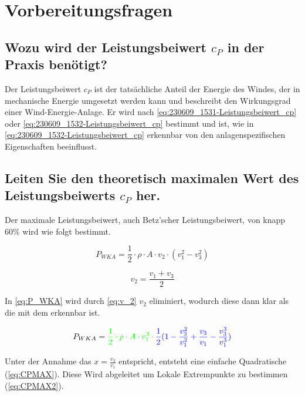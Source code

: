 \section{Vorbereitungsfragen}
\subsection{Wozu wird der Leistungsbeiwert \texorpdfstring{$c_P$}{} in der Praxis benötigt?}
Der Leistungsbeiwert $c_P$ ist der tatsächliche Anteil der Energie des Windes, der in mechanische Energie umgesetzt werden kann und beschreibt den Wirkungsgrad einer Wind-Energie-Anlage. Er wird nach \autoref{eq:230609_1531-Leistungsbeiwert_cp} oder \autoref{eq:230609_1532-Leistungsbeiwert_cp} bestimmt und ist, wie in \ref{eq:230609_1532-Leistungsbeiwert_cp} erkennbar von den anlagenspezifischen Eigenschaften beeinflusst.



\subsection{Leiten Sie den theoretisch maximalen Wert des Leistungsbeiwerts \texorpdfstring{$c_P$}{} her.}
Der maximale Leistungsbeiwert, auch Betz'scher Leistungsbeiwert, von knapp 60\% wird wie folgt bestimmt.

\begin{equation}
P_{WKA}= \frac{1}{2} \cdot \rho \cdot A \cdot v_2 \cdot (v_1^2 - v_3^2)
\label{eq:P_WKA} 
\end{equation}

\begin{equation}
v_2= \frac{v_1+v_3}{2} 
\label{eq:v_2} 
\end{equation}

In \ref{eq:P_WKA} wird durch \ref{eq:v_2} $v_2$ eliminiert, wodurch diese dann klar als die \color{green}{Leistung des Windes} mit dem \color{blue}{Leistungsbeiwert} erkennbar ist. 

\begin{equation}
P_{WKA}= \color{green}{\frac{1}{2} \cdot \rho \cdot A \cdot v_1^3 } \cdot \color{blue}{\frac{1}{2} (1-\frac{v_3^2}{v_1^2} + \frac{v_3}{v_1} - \frac{v_3^3}{v_1^3}})
\label{eq:P_WKA2} 
\end{equation}

\color{black}{}

Unter der Annahme das $x=\frac{v_3}{v_1}$ entspricht, entsteht eine einfache Quadratische (\autoref{eq:CPMAX}). Diese Wird abgeleitet um Lokale Extrempunkte zu bestimmen (\autoref{eq:CPMAX2}). 

